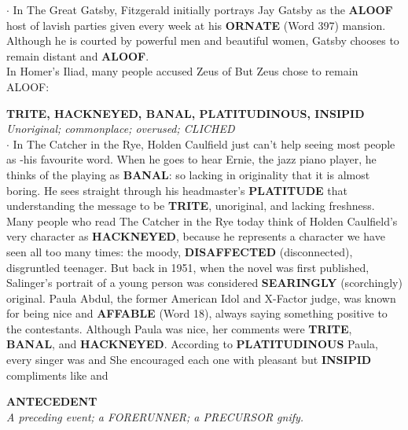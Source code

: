 \documentclass{exam}
\begin{document}
\begin{questions}
$\cdot$ In The Great Gatsby, Fitzgerald initially portrays Jay Gatsby as the \textbf{ALOOF} host of lavish parties given every week at his \textbf{ORNATE} (Word 397) mansion. Although he is courted by powerful men and beautiful women, Gatsby chooses to remain distant and \textbf{ALOOF}.\\

 In Homer's Iliad, many people accused Zeus of  But Zeus chose to remain ALOOF: 
 
\question \textbf{TRITE, HACKNEYED, BANAL, PLATITUDINOUS, INSIPID}\\ 
\textit{Unoriginal; commonplace; overused; CLICHED}\\

$\cdot$ In The Catcher in the Rye, Holden Caulfield just can't help seeing most people as -his favourite word. When he goes to hear Ernie, the jazz piano player, he thinks of the playing as \textbf{BANAL}: so lacking in originality that it is almost boring. He sees straight through his headmaster’s \textbf{PLATITUDE} that  understanding the message to be \textbf{TRITE}, unoriginal, and lacking freshness. Many people who read The Catcher in the Rye today think of Holden Caulfield’s very character as \textbf{HACKNEYED}, because he represents a character we have seen all too many times: the moody, \textbf{DISAFFECTED} (disconnected), disgruntled teenager. But back in 1951, when the novel was first published, Salinger's portrait of a young person was considered \textbf{SEARINGLY} (scorchingly) original. Paula Abdul, the former American Idol and X-Factor judge, was known for being nice and \textbf{AFFABLE} (Word 18), always saying something positive to the contestants. Although Paula was nice, her comments were \textbf{TRITE}, \textbf{BANAL}, and \textbf{HACKNEYED}. According to \textbf{PLATITUDINOUS} Paula, every singer was   and  She encouraged each one with pleasant but \textbf{INSIPID} compliments like   and 

\question \textbf{ANTECEDENT}\\
\textit{A preceding event; a FORERUNNER; a PRECURSOR gnify.}\\  


\end{questions}
\end{document}
